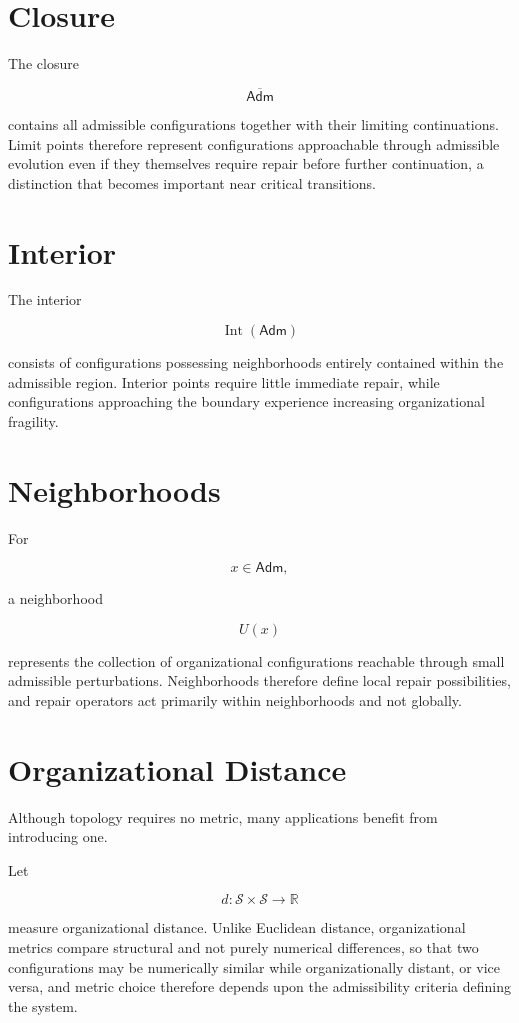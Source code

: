 \documentclass[11pt,oneside]{book}
\numberwithin{equation}{chapter}
\theoremstyle{definition}
\theoremstyle{plain}
\newcommand{\Adm}{\mathsf{Adm}}
\begin{document}
\section{Closure}

The closure

\[
\overline{\Adm}
\]

contains all admissible configurations together with their limiting continuations. Limit points therefore represent configurations approachable through admissible evolution even if they themselves require repair before further continuation, a distinction that becomes important near critical transitions.

\section{Interior}

The interior

\[
\operatorname{Int}
(\Adm)
\]

consists of configurations possessing neighborhoods entirely contained within the admissible region. Interior points require little immediate repair, while configurations approaching the boundary experience increasing organizational fragility.

\section{Neighborhoods}

For

\[
x
\in
\Adm,
\]

a neighborhood

\[
U(x)
\]

represents the collection of organizational configurations reachable through small admissible perturbations. Neighborhoods therefore define local repair possibilities, and repair operators act primarily within neighborhoods and not globally.

\section{Organizational Distance}

Although topology requires no metric, many applications benefit from
introducing one.

Let

\[
d
:
\mathcal S
\times
\mathcal S
\rightarrow
\mathbb R
\]

measure organizational distance. Unlike Euclidean distance, organizational metrics compare structural and not purely numerical differences, so that two configurations may be numerically similar while organizationally distant, or vice versa, and metric choice therefore depends upon the admissibility criteria defining the system.
\end{document}
